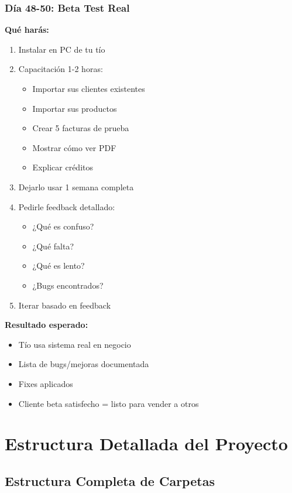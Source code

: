 \documentclass[11pt,a4paper]{article}
\begin{document}
\subsubsection{Día 48-50: Beta Test Real}

\textbf{Qué harás:}
\begin{enumerate}
    \item Instalar en PC de tu tío
    \item Capacitación 1-2 horas:
    \begin{itemize}
        \item Importar sus clientes existentes
        \item Importar sus productos
        \item Crear 5 facturas de prueba
        \item Mostrar cómo ver PDF
        \item Explicar créditos
    \end{itemize}
    \item Dejarlo usar 1 semana completa
    \item Pedirle feedback detallado:
    \begin{itemize}
        \item ¿Qué es confuso?
        \item ¿Qué falta?
        \item ¿Qué es lento?
        \item ¿Bugs encontrados?
    \end{itemize}
    \item Iterar basado en feedback
\end{enumerate}

\textbf{Resultado esperado:} 
\begin{itemize}
    \item Tío usa sistema real en negocio
    \item Lista de bugs/mejoras documentada
    \item Fixes aplicados
    \item Cliente beta satisfecho = listo para vender a otros
\end{itemize}

\newpage

\section{Estructura Detallada del Proyecto}

\subsection{Estructura Completa de Carpetas}
\end{document}
